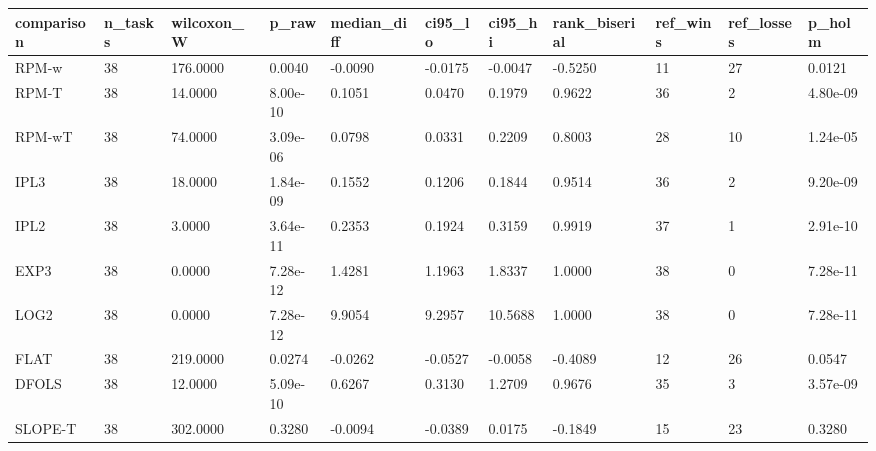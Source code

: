 \begin{tabular}{lllllllllll}
\hline
comparison & n\_tasks & wilcoxon\_W & p\_raw & median\_diff & ci95\_lo & ci95\_hi & rank\_biserial & ref\_wins & ref\_losses & p\_holm \\
\hline
RPM-w & 38 & 176.0000 & 0.0040 & -0.0090 & -0.0175 & -0.0047 & -0.5250 & 11 & 27 & 0.0121 \\
RPM-T & 38 & 14.0000 & 8.00e-10 & 0.1051 & 0.0470 & 0.1979 & 0.9622 & 36 & 2 & 4.80e-09 \\
RPM-wT & 38 & 74.0000 & 3.09e-06 & 0.0798 & 0.0331 & 0.2209 & 0.8003 & 28 & 10 & 1.24e-05 \\
IPL3 & 38 & 18.0000 & 1.84e-09 & 0.1552 & 0.1206 & 0.1844 & 0.9514 & 36 & 2 & 9.20e-09 \\
IPL2 & 38 & 3.0000 & 3.64e-11 & 0.2353 & 0.1924 & 0.3159 & 0.9919 & 37 & 1 & 2.91e-10 \\
EXP3 & 38 & 0.0000 & 7.28e-12 & 1.4281 & 1.1963 & 1.8337 & 1.0000 & 38 & 0 & 7.28e-11 \\
LOG2 & 38 & 0.0000 & 7.28e-12 & 9.9054 & 9.2957 & 10.5688 & 1.0000 & 38 & 0 & 7.28e-11 \\
FLAT & 38 & 219.0000 & 0.0274 & -0.0262 & -0.0527 & -0.0058 & -0.4089 & 12 & 26 & 0.0547 \\
DFOLS & 38 & 12.0000 & 5.09e-10 & 0.6267 & 0.3130 & 1.2709 & 0.9676 & 35 & 3 & 3.57e-09 \\
SLOPE-T & 38 & 302.0000 & 0.3280 & -0.0094 & -0.0389 & 0.0175 & -0.1849 & 15 & 23 & 0.3280 \\
\hline
\end{tabular}
